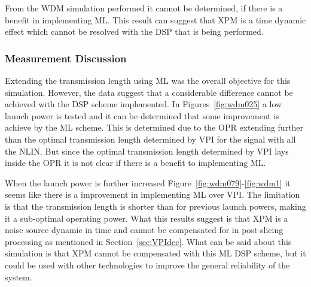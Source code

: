 From the WDM simulation performed it cannot be determined, if there is a benefit in implementing ML. This result can suggest that XPM is a time dynamic effect which cannot be resolved with the DSP that is being performed.


\subsubsection{Measurement Discussion}

Extending the transmission length using ML was the overall objective for this simulation. However, the data suggest that a considerable difference cannot be achieved with the DSP scheme implemented. In Figures~\ref{fig:wdm025} a low launch power is tested and it can be determined that some improvement is achieve by the ML scheme. This is determined due to the OPR extending further than the optimal transmission length determined by VPI for the signal with all the NLIN. But since the optimal transmission length determined by VPI lays inside the OPR it is not clear if there is a benefit to implementing ML.

When the launch power is further increased Figure~\ref{fig:wdm079}-\ref{fig:wdm1} it seems like there is a improvement in implementing ML over VPI. The limitation is that the transmission length is shorter than for previous launch powers, making it a sub-optimal operating power. What this results suggest is that XPM is a noise source dynamic in time and cannot be compensated for in post-slicing processing as mentioned in Section~\ref{sec:VPIdec}. What can be said about this simulation is that XPM cannot be compensated with this ML DSP scheme, but it could be used with other technologies to improve the general reliability of the system. 